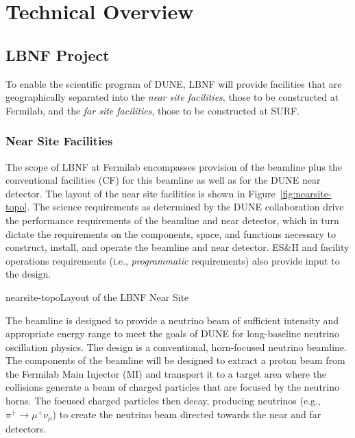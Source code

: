 \chapter{Technical Overview}
\label{v1ch:tech-designs}
 
 
 
\section{LBNF Project}
 
To enable the scientific program of DUNE, LBNF will provide facilities that are geographically separated into the \textit{near site facilities}, those to be constructed at Fermilab, and the \textit{far site facilities}, those to be constructed at SURF.

\subsection{Near Site Facilities}
 
The scope of LBNF at Fermilab encompasses provision of the beamline plus the conventional facilities (CF) for this beamline as well as for the DUNE near detector. The layout of the near site facilities is shown in Figure~\ref{fig:nearsite-topo}. The science requirements as determined by the DUNE
collaboration drive the performance requirements of the beamline and near detector, which in turn %
dictate the requirements on  
the components, space, and functions necessary to construct, install, and operate the beamline and near detector. ES\&H and facility operations requirements (i.e., \textit{programmatic} requirements) also provide input to the design.
 
\begin{dunefigure}{nearsite-topo}{Layout of the LBNF Near Site}
\end{dunefigure}
 
 
The beamline is designed to provide a neutrino beam of sufficient intensity and appropriate energy range to meet the goals of DUNE for long-baseline neutrino oscillation physics. The design is a conventional, horn-focused neutrino beamline. The components of the beamline will be designed to extract a proton beam from the Fermilab Main Injector (MI) and transport it to a target area where the collisions generate a beam of charged particles that are focused by the neutrino horns. The focused charged particles then decay, producing neutrinos (e.g., $\pi^+\rightarrow \mu^+\nu_\mu$) to create the neutrino beam directed towards the near and far detectors.
 
